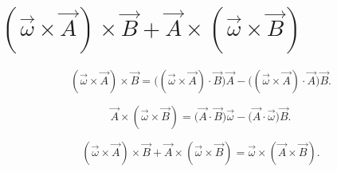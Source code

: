 \documentclass[letter, 10pts]{article}
\begin{document}
\section*{$(\vec{\omega} \times \vec{A} ) \times  \vec{B} + \vec{A} \times  (\vec{\omega} \times \vec{B})$}

\[
(\vec{\omega} \times \vec{A}) \times \vec{B} = \big((\vec{\omega} \times \vec{A}) \cdot \vec{B}\big) \vec{A} - \big((\vec{\omega} \times \vec{A}) \cdot \vec{A}\big) \vec{B}.
\]


\[
\vec{A} \times (\vec{\omega} \times \vec{B}) = \big(\vec{A} \cdot \vec{B}\big) \vec{\omega} - \big(\vec{A} \cdot \vec{\omega}\big) \vec{B}.
\]

\[
(\vec{\omega} \times \vec{A}) \times \vec{B} + \vec{A} \times (\vec{\omega} \times \vec{B}) = \vec{\omega} \times (\vec{A} \times \vec{B}).
\]
\end{document}
